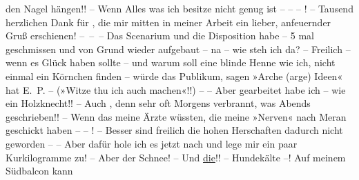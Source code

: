                den Nagel hängen!! – Wenn Alles was ich besitze nicht genug ist – – – ! – Tausend
               herzlichen Dank für \label{K_L03709-1v}\label{K_L03709-1}, die
               mir mitten in meiner Arbeit ein lieber, anfeuernder Gruß {\pb}erschienen! – – – Das Scenarium und die Disposition habe – 5 mal geschmissen und
               von Grund wieder aufgebaut – na – wie steh ich da? – Freilich – wenn es Glück haben
               sollte – und warum soll eine blinde Henne wie ich, nicht einmal ein Körnchen finden –
               würde das Publikum, sagen »Arche (arge) Ideen« hat E. P. – (»Witze thu ich auch
               machen«!!) – – Aber gearbeitet habe ich – wie ein Holzknecht!! – Auch \label{K_L03709-2v}\label{K_L03709-2}, denn sehr oft Morgens verbrannt, was Abends geschrieben!! – Wenn
               das meine Ärzte wüssten, die meine »Nerven« nach Meran geschickt haben – – \label{K_L03709-3v}\label{K_L03709-3}! – Besser sind freilich die
               hohen Herschaften dadurch nicht geworden – – Aber dafür hole ich es
                  jetzt nach und lege mir ein paar Kurkilogramme zu! – Aber der Schnee!
               – Und \uline{die}!! – Hundekälte –! Auf meinem Südbalcon kann
